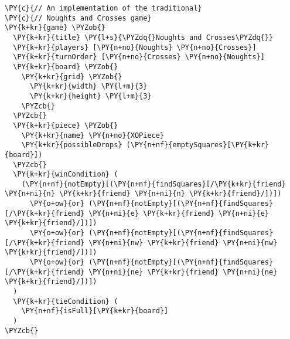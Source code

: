 \begin{Verbatim}[commandchars=\\\{\}]
\PY{c}{// An implementation of the traditional}
\PY{c}{// Noughts and Crosses game}
\PY{k+kr}{game} \PYZob{}
  \PY{k+kr}{title} \PY{l+s}{\PYZdq{}Noughts and Crosses\PYZdq{}}
  \PY{k+kr}{players} [\PY{n+no}{Noughts} \PY{n+no}{Crosses}]
  \PY{k+kr}{turnOrder} [\PY{n+no}{Crosses} \PY{n+no}{Noughts}]
  \PY{k+kr}{board} \PYZob{}
    \PY{k+kr}{grid} \PYZob{}
      \PY{k+kr}{width} \PY{l+m}{3}
      \PY{k+kr}{height} \PY{l+m}{3}
    \PYZcb{}
  \PYZcb{}
  \PY{k+kr}{piece} \PYZob{}
    \PY{k+kr}{name} \PY{n+no}{XOPiece}
    \PY{k+kr}{possibleDrops} (\PY{n+nf}{emptySquares}[\PY{k+kr}{board}])
  \PYZcb{}
  \PY{k+kr}{winCondition} (
    (\PY{n+nf}{notEmpty}[(\PY{n+nf}{findSquares}[/\PY{k+kr}{friend} \PY{n+ni}{n} \PY{k+kr}{friend} \PY{n+ni}{n} \PY{k+kr}{friend}/])])
      \PY{o+ow}{or} (\PY{n+nf}{notEmpty}[(\PY{n+nf}{findSquares}[/\PY{k+kr}{friend} \PY{n+ni}{e} \PY{k+kr}{friend} \PY{n+ni}{e} \PY{k+kr}{friend}/])])
      \PY{o+ow}{or} (\PY{n+nf}{notEmpty}[(\PY{n+nf}{findSquares}[/\PY{k+kr}{friend} \PY{n+ni}{nw} \PY{k+kr}{friend} \PY{n+ni}{nw} \PY{k+kr}{friend}/])])
      \PY{o+ow}{or} (\PY{n+nf}{notEmpty}[(\PY{n+nf}{findSquares}[/\PY{k+kr}{friend} \PY{n+ni}{ne} \PY{k+kr}{friend} \PY{n+ni}{ne} \PY{k+kr}{friend}/])])
  )
  \PY{k+kr}{tieCondition} (
    \PY{n+nf}{isFull}[\PY{k+kr}{board}]
  )
\PYZcb{}
\end{Verbatim}
